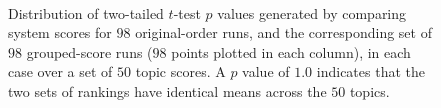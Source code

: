 \begin{figure}[t!]
\centering
{}
\\
\caption{Distribution of two-tailed $t$-test $p$ values generated by
comparing system scores for $98$ original-order runs, and the
corresponding set of $98$ grouped-score runs ($98$ points plotted in
each column), in each case over a set of $50$ topic scores.
A $p$ value of $1.0$ indicates that the two sets of rankings have
identical means across the $50$ topics.
\label{fig-rho-p-value}}
\end{figure}

